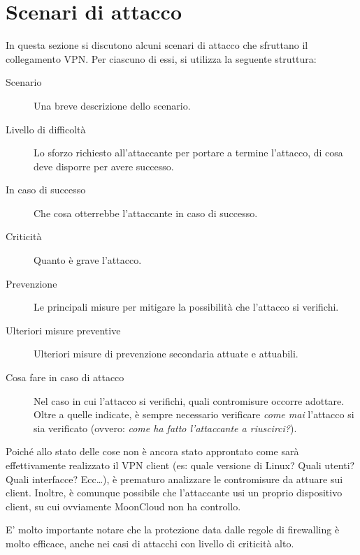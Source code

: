 \section{Scenari di attacco}\label{sec:attacks}

In questa sezione si discutono alcuni scenari di attacco
che sfruttano il collegamento VPN.
Per ciascuno di essi, si utilizza la seguente struttura:
\begin{description}
    \item[Scenario]Una breve descrizione dello scenario.
    \item[Livello di difficoltà]Lo sforzo richiesto all'attaccante
    per portare a termine l'attacco, di cosa deve disporre per avere
    successo.
    \item[In caso di successo]Che cosa otterrebbe l'attaccante
    in caso di successo.
    \item[Criticità]Quanto è grave l'attacco.
    \item[Prevenzione]Le principali misure
    per mitigare la possibilità che l'attacco si verifichi.
    \item[Ulteriori misure preventive]Ulteriori misure
    di prevenzione secondaria attuate e attuabili.
    \item[Cosa fare in caso di attacco]Nel caso in cui
    l'attacco si verifichi, quali contromisure occorre
    adottare. Oltre a quelle indicate, è sempre necessario
    verificare \textit{come mai} l'attacco si sia verificato
    (ovvero: \textit{come ha fatto l'attaccante a riuscirci?}).
\end{description}
Poiché allo stato delle cose non è ancora stato approntato come
sarà effettivamente realizzato il VPN client (es: quale versione
di Linux? Quali utenti? Quali interfacce? Ecc\ldots), è prematuro
analizzare le contromisure da attuare sui client.
Inoltre, è comunque possibile che l'attaccante usi un proprio
dispositivo client, su cui ovviamente MoonCloud non ha controllo.

E' molto importante notare che la protezione data dalle regole di
firewalling è molto efficace, anche nei casi di attacchi con livello
di criticità alto.



